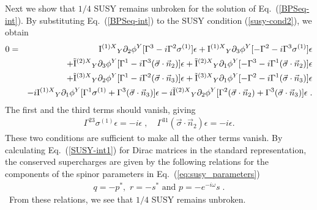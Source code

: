 \documentclass[a4paper,12pt]{article}
\begin{document}
Next we show that $1/4$ SUSY remains unbroken for the solution 
of Eq.~(\ref{BPSeq-int}).
By substituting  Eq.~(\ref{BPSeq-int}) to the SUSY condition 
(\ref{susy-cond2}), we obtain 
\begin{eqnarray}
0 &=& {\rm I}^{(1)X}{}_Y\partial_2\phi^Y[\Gamma^3 - i\Gamma^2\sigma^{(1)}]\epsilon
     + {\rm I}^{(1)X}{}_Y\partial_3\phi^Y[-\Gamma^2 - i\Gamma^3\sigma^{(1)}]\epsilon 
       \nonumber \\
 &{}& +\tilde{\rm I}^{(2)X}{}_Y\partial_3\phi^Y[\Gamma^1 - i\Gamma^3
      (\vec{\sigma}\cdot \vec{n}_2)]\epsilon
     + \tilde{\rm I}^{(2)X}{}_Y\partial_1\phi^Y[-\Gamma^3 - i\Gamma^1
       (\vec{\sigma}\cdot \vec{n}_2)]\epsilon 
       \nonumber \\
 &{}& +\tilde{\rm I}^{(3)X}{}_Y\partial_2\phi^Y[\Gamma^1 - i\Gamma^2
       (\vec{\sigma}\cdot \vec{n}_3)]\epsilon
     + \tilde{\rm I}^{(3)X}{}_Y\partial_1\phi^Y[-\Gamma^2 - i\Gamma^1
       (\vec{\sigma}\cdot \vec{n}_3)]\epsilon 
       \nonumber \\
 &{}& -i{\rm I}^{(1)X}{}_Y\partial_1\phi^Y[\Gamma^1\sigma^{(1)} 
        + \Gamma^3(\vec{\sigma}\cdot \vec{n}_3)]\epsilon 
      -i\tilde{\rm I}^{(2)X}{}_Y\partial_2\phi^Y[\Gamma^2(\vec{\sigma}\cdot \vec{n}_2) 
        + \Gamma^3(\vec{\sigma}\cdot \vec{n}_3)]\epsilon 
   \;.
\end{eqnarray}
The first and the third terms should vanish, giving 
\begin{eqnarray}
  \Gamma^{23}\sigma^{(1)}\epsilon  
    = -i\epsilon \; , \quad
  \Gamma^{31}(\vec{\sigma}\cdot \vec{n}_2)\epsilon 
    = -i\epsilon. 
\label{SUSY-int1} 
\end{eqnarray}
These two conditions are sufficient to make all the other terms vanish. 
By calculating Eq.~(\ref{SUSY-int1}) for Dirac matrices in the 
standard representation, the conserved supercharges are given by 
the following relations for the components of the spinor parameters 
in Eq.~(\ref{eq:susy_parameters}) 
\begin{eqnarray}
  q=-p^*, \,\, r=-s^* \,\, \mbox{and} \,\, p=-e^{-i\omega}s \;. 
\label{1/4SUSY}
\end{eqnarray}
~From these relations, we see that $1/4$ SUSY remains unbroken. 
\end{document}
